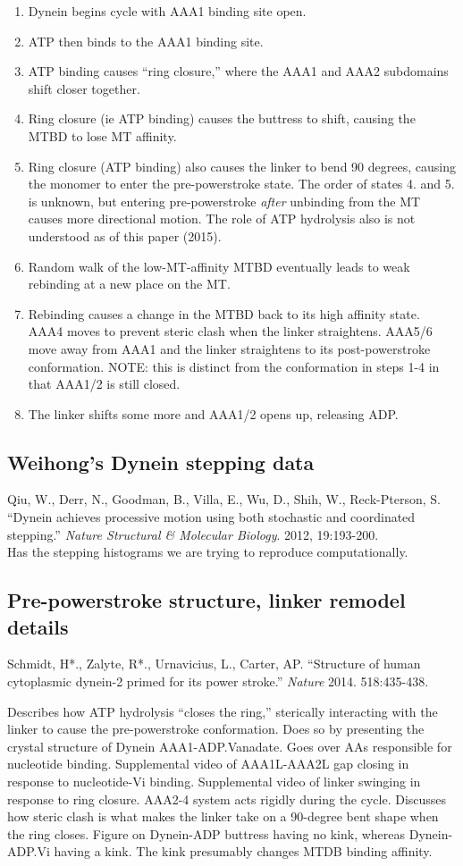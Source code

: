 \documentclass[10pt]{article} %
\begin{document}
\begin{enumerate}
\item Dynein begins cycle with AAA1 binding site open.
\item ATP then binds to the AAA1 binding site.
\item ATP binding causes ``ring closure,'' where the AAA1 and AAA2 subdomains shift closer together.
\item Ring closure (ie ATP binding) causes the buttress to shift, causing the MTBD to lose MT affinity.
\item Ring closure (ATP binding) also causes the linker to bend 90 degrees, causing the monomer to enter the pre-powerstroke state. The order of states 4. and 5. is unknown, but entering pre-powerstroke \textit{after} unbinding from the MT causes more directional motion. The role of ATP hydrolysis also is not understood as of this paper (2015).
\item Random walk of the low-MT-affinity MTBD eventually leads to weak rebinding at a new place on the MT.
\item Rebinding causes a change in the MTBD back to its high affinity state. AAA4 moves to prevent steric clash when the linker straightens. AAA5/6 move away from AAA1 and the linker straightens to its post-powerstroke conformation. NOTE: this is distinct from the conformation in steps 1-4 in that AAA1/2 is still closed.
\item The linker shifts some more and AAA1/2 opens up, releasing ADP.
\end{enumerate}

\subsection{Weihong's Dynein stepping data}
Qiu, W., Derr, N., Goodman, B., Villa, E., Wu, D., Shih, W., Reck-Pterson, S. ``Dynein achieves processive motion using both stochastic and coordinated stepping.'' \textit{Nature Structural \& Molecular Biology}. 2012, 19:193-200.\\

Has the stepping histograms we are trying to reproduce computationally.

\subsection{Pre-powerstroke structure, linker remodel details}
Schmidt, H*., Zalyte, R*., Urnavicius, L., Carter, AP. ``Structure of human cytoplasmic dynein-2 primed for its power stroke.'' \textit{Nature} 2014. 518:435-438.

Describes how ATP hydrolysis ``closes the ring,'' sterically interacting with the linker to cause the pre-powerstroke conformation. Does so by presenting the crystal structure of Dynein AAA1-ADP.Vanadate. Goes over AAs responsible for nucleotide binding. Supplemental video of AAA1L-AAA2L gap closing in response to nucleotide-Vi binding. Supplemental video of linker swinging in response to ring closure. AAA2-4 system acts rigidly during the cycle. Discusses how steric clash is what makes the linker take on a 90-degree bent shape when the ring closes. Figure on Dynein-ADP buttress having no kink, whereas Dynein-ADP.Vi having a kink. The kink presumably changes MTDB binding affinity.
\end{document}
